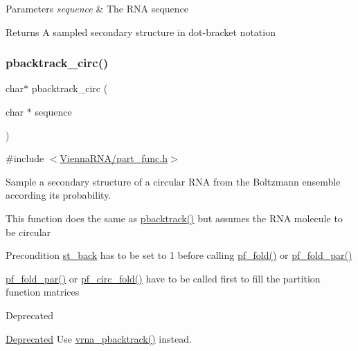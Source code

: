 \begin{DoxyParams}{Parameters}
{\em sequence} & The R\+NA sequence \\
\hline
\end{DoxyParams}
\begin{DoxyReturn}{Returns}
A sampled secondary structure in dot-\/bracket notation 
\end{DoxyReturn}
\mbox{\label{group__subopt__stochbt__deprecated_ga00474051204ac9ad576b3e45174d03ff}} 
\subsubsection{\texorpdfstring{pbacktrack\_circ()}{pbacktrack\_circ()}}
{\footnotesize\ttfamily char$\ast$ pbacktrack\+\_\+circ (\begin{DoxyParamCaption}\item[{char $\ast$}]{sequence }\end{DoxyParamCaption})}



{\ttfamily \#include $<$\mbox{\hyperlink{part__func_8h}{Vienna\+R\+N\+A/part\+\_\+func.\+h}}$>$}



Sample a secondary structure of a circular R\+NA from the Boltzmann ensemble according its probability. 

This function does the same as \mbox{\hyperlink{group__subopt__stochbt__deprecated_gac03ca6db186bb3bf0a2a326d7fb3ba03}{pbacktrack()}} but assumes the R\+NA molecule to be circular

\begin{DoxyPrecond}{Precondition}
\mbox{\hyperlink{group__subopt__stochbt__deprecated_gacd79b1a570e6ad9be24cb11fe8cae30a}{st\+\_\+back}} has to be set to 1 before calling \mbox{\hyperlink{group__part__func__global__deprecated_gadc3db3d98742427e7001a7fd36ef28c2}{pf\+\_\+fold()}} or \mbox{\hyperlink{group__part__func__global__deprecated_gac4f95bee734b2563a3d6e9932117ebdf}{pf\+\_\+fold\+\_\+par()}} 

\mbox{\hyperlink{group__part__func__global__deprecated_gac4f95bee734b2563a3d6e9932117ebdf}{pf\+\_\+fold\+\_\+par()}} or \mbox{\hyperlink{group__part__func__global__deprecated_ga819ce5fca8984004ac81c4a3b04cb735}{pf\+\_\+circ\+\_\+fold()}} have to be called first to fill the partition function matrices
\end{DoxyPrecond}
\begin{DoxyRefDesc}{Deprecated}
\item[\mbox{\hyperlink{deprecated__deprecated000099}{Deprecated}}]Use \mbox{\hyperlink{group__subopt__stochbt_ga594844ac73c4e66e00d6791b31540634}{vrna\+\_\+pbacktrack()}} instead.\end{DoxyRefDesc}



